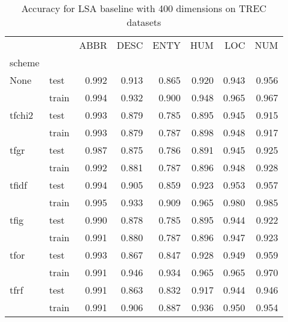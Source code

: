 \begin{table}[h]
\begin{center}

\begin{tabular}{llrrrrrr}
\toprule
{} &  &  ABBR &  DESC &  ENTY &  HUM &  LOC &  NUM \\
scheme &  &       &       &       &      &      &      \\
\midrule
None & test &     0.992 &     0.913 &     0.865 &    0.920 &    0.943 &    0.956 \\
{} & train &     0.994 &     0.932 &     0.900 &    0.948 &    0.965 &    0.967 \\
tfchi2 & test &     0.993 &     0.879 &     0.785 &    0.895 &    0.945 &    0.915 \\
{} & train &     0.993 &     0.879 &     0.787 &    0.898 &    0.948 &    0.917 \\
tfgr & test &     0.987 &     0.875 &     0.786 &    0.891 &    0.945 &    0.925 \\
{} & train &     0.992 &     0.881 &     0.787 &    0.896 &    0.948 &    0.928 \\
tfidf & test &     0.994 &     0.905 &     0.859 &    0.923 &    0.953 &    0.957 \\
{} & train &     0.995 &     0.933 &     0.909 &    0.965 &    0.980 &    0.985 \\
tfig & test &     0.990 &     0.878 &     0.785 &    0.895 &    0.944 &    0.922 \\
{} & train &     0.991 &     0.880 &     0.787 &    0.896 &    0.947 &    0.923 \\
tfor & test &     0.993 &     0.867 &     0.847 &    0.928 &    0.949 &    0.959 \\
{} & train &     0.991 &     0.946 &     0.934 &    0.965 &    0.965 &    0.970 \\
tfrf & test &     0.991 &     0.863 &     0.832 &    0.917 &    0.944 &    0.946 \\
{} & train &     0.991 &     0.906 &     0.887 &    0.936 &    0.950 &    0.954 \\
\bottomrule
\end{tabular}

\caption[Accuracy for LSA baseline with 400 dimensions on TREC datasets]{Accuracy for LSA baseline with 400 dimensions on TREC datasets}
\label{tab:lsa:resuts:abs:400:TREC}
\end{center}
\end{table}





